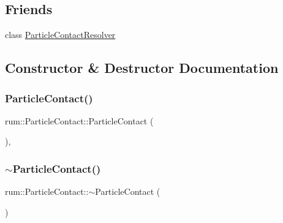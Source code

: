 \subsection*{Friends}
\begin{DoxyCompactItemize}
\item 
class \mbox{\hyperlink{classrum_1_1_particle_contact_ab2e3f4c3dc9b46966c6ec90e0fe88b6c}{Particle\+Contact\+Resolver}}
\end{DoxyCompactItemize}


\subsection{Constructor \& Destructor Documentation}
\mbox{\label{classrum_1_1_particle_contact_aab189df2f191ed165769f7545c0681d9}} 
\subsubsection{\texorpdfstring{Particle\+Contact()}{ParticleContact()}}
{\footnotesize\ttfamily rum\+::\+Particle\+Contact\+::\+Particle\+Contact (\begin{DoxyParamCaption}{ }\end{DoxyParamCaption})\hspace{0.3cm}{\ttfamily [explicit]}, {\ttfamily [default]}}

\mbox{\label{classrum_1_1_particle_contact_aa1f7ccaa9ef517fae352e24a9bc8e79e}} 
\subsubsection{\texorpdfstring{$\sim$\+Particle\+Contact()}{~ParticleContact()}}
{\footnotesize\ttfamily rum\+::\+Particle\+Contact\+::$\sim$\+Particle\+Contact (\begin{DoxyParamCaption}{ }\end{DoxyParamCaption})\hspace{0.3cm}{\ttfamily [default]}}




